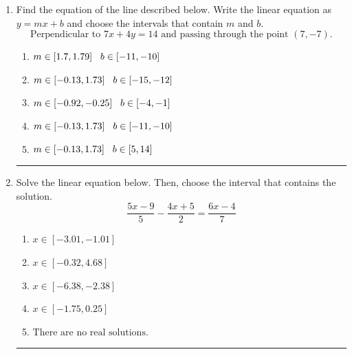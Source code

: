 \documentclass[14pt]{extbook}
\newcommand{\litem}[1]{\item#1\hspace*{-1cm}\rule{\textwidth}{0.4pt}}
\begin{document}
\begin{enumerate}
\litem{
Find the equation of the line described below. Write the linear equation as $ y=mx+b $ and choose the intervals that contain $m$ and $b$.\[ \text{Perpendicular to } 7 x + 4 y = 14 \text{ and passing through the point } (7, -7). \]\begin{enumerate}[label=\Alph*.]
\item \( m \in [1.7, 1.79] \hspace*{3mm} b \in [-11, -10] \)
\item \( m \in [-0.13, 1.73] \hspace*{3mm} b \in [-15, -12] \)
\item \( m \in [-0.92, -0.25] \hspace*{3mm} b \in [-4, -1] \)
\item \( m \in [-0.13, 1.73] \hspace*{3mm} b \in [-11, -10] \)
\item \( m \in [-0.13, 1.73] \hspace*{3mm} b \in [5, 14] \)

\end{enumerate} }
\litem{
Solve the linear equation below. Then, choose the interval that contains the solution.\[ \frac{5x -9}{5} - \frac{4x + 5}{2} = \frac{6x -4}{7} \]\begin{enumerate}[label=\Alph*.]
\item \( x \in [-3.01, -1.01] \)
\item \( x \in [-0.32, 4.68] \)
\item \( x \in [-6.38, -2.38] \)
\item \( x \in [-1.75, 0.25] \)
\item \( \text{There are no real solutions.} \)


\end{enumerate}}
\end{enumerate}
\end{document}
